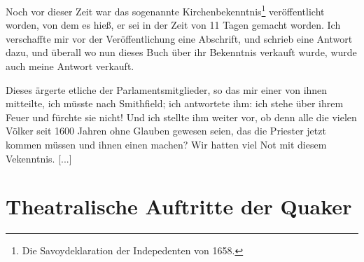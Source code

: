 Noch vor dieser Zeit war das sogenannte 
Kirchenbekenntnis\footnote{Die Savoydeklaration der 
Indepedenten von 1658.}
veröffentlicht worden, von dem es hieß, er sei in der Zeit von
11 Tagen gemacht worden. Ich verschaffte mir vor der 
Veröffentlichung eine Abschrift, und schrieb eine Antwort dazu, und
überall wo nun dieses Buch über ihr Bekenntnis verkauft wurde,
wurde auch meine Antwort verkauft.  

Dieses ärgerte etliche der
Parlamentsmitglieder, so das mir einer von ihnen mitteilte, ich
müsste nach Smithfield; ich antwortete ihm: 
ich stehe über ihrem
Feuer und fürchte sie nicht! Und ich stellte ihm weiter vor, ob
denn alle die vielen Völker seit 1600 Jahren ohne Glauben 
gewesen seien, das die Priester jetzt kommen müssen und ihnen einen
machen?  Wir hatten viel Not mit diesem Vekenntnis. [...]

\section{Theatralische Auftritte der Quaker}

